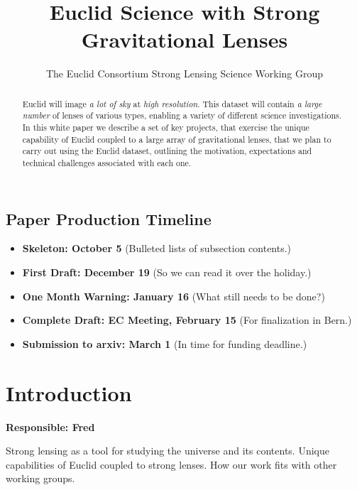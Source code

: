 \documentclass{article}
\begin{document}
\title{Euclid Science with Strong Gravitational Lenses}

\author{The Euclid Consortium Strong Lensing Science Working Group}

\maketitle


\begin{abstract}
\noindent Euclid will image \emph{a lot of sky} at \emph{high resolution}. This dataset
will contain {\it a large number} of lenses of various types, enabling a variety 
of different  science investigations. In this white paper we describe a set of
key projects, that exercise the unique capability of Euclid coupled to a large
array of gravitational lenses, that we plan to carry out using the Euclid
dataset, outlining the motivation, expectations and technical challenges
associated with each one.
\end{abstract}


\subsection*{Paper Production Timeline}
\begin{itemize}
    \item {\bf Skeleton: October 5} (Bulleted lists of subsection contents.)
    \item {\bf First Draft: December 19} (So we can read it over the holiday.)
    \item {\bf One Month Warning: January 16} (What still needs to be done?)
    \item {\bf Complete Draft: EC Meeting, February 15} (For finalization in Bern.)
    \item {\bf Submission to arxiv: March 1} (In time for funding deadline.)
\end{itemize}



\section{Introduction}

{\bf Responsible: Fred}

Strong lensing as a tool for studying the universe and its contents. 
Unique capabilities of Euclid coupled to strong lenses. How our 
work fits with other working groups. 
\end{document}
